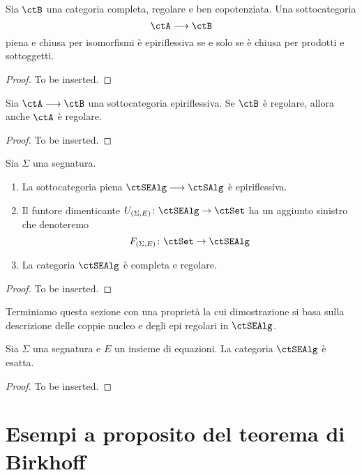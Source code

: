 \begin{lemma}\label{lemma_caract_epirifl}
	Sia \(\ctB\) una categoria completa, regolare e ben copotenziata. Una sottocategoria
	\[
		\ctA \fun \ctB
	\]
	piena e chiusa per isomorfismi è epiriflessiva se e solo se è chiusa per prodotti e sottoggetti.
\end{lemma}

\begin{proof}
	To be inserted.
\end{proof}

\begin{lemma}\label{lemma_epirifl_reg}
	Sia \(\ctA \fun \ctB\) una sottocategoria epiriflessiva. Se \(\ctB\) è regolare, allora anche \(\ctA\) è regolare.
\end{lemma}

\begin{proof}
	To be inserted.
\end{proof}

\begin{corollary}\label{cor_alg_reg}
	Sia \(\Sigma\) una segnatura.
	\begin{enumerate}
		\item La sottocategoria piena \(\ctSEAlg \fun \ctSAlg\) è epiriflessiva.
		\item Il funtore dimenticante \(U_{(\Sigma,E)} \colon \ctSEAlg \to \ctSet\) ha un aggiunto sinistro che denoteremo
		      \[
			      F_{(\Sigma,E)} \colon \ctSet \to \ctSEAlg
		      \]
		\item La categoria \(\ctSEAlg\) è completa e regolare.
	\end{enumerate}
\end{corollary}

\begin{proof}
	To be inserted.
\end{proof}

Terminiamo questa sezione con una proprietà la cui dimostrazione si basa sulla descrizione delle coppie nucleo e degli
epi regolari in \(\ctSEAlg\).

\begin{proposition}\label{prop_alg_ex}
	Sia \(\Sigma\) una segnatura e \(E\) un insieme di equazioni. La categoria \(\ctSEAlg\) è esatta.
\end{proposition}

\begin{proof}
	To be inserted.
\end{proof}

\section{Esempi a proposito del teorema di Birkhoff}\label{sec_ex_th_Birkhoff}

